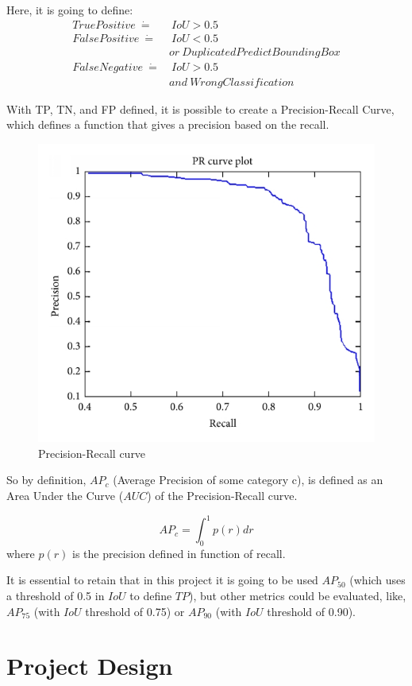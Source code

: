 \documentclass[11pt, a4paper, twocolumn]{article}
\begin{document}
Here, it is going to define:
\begin{align*}
TruePositive\ \dot=&\ IoU > 0.5 \\
FalsePositive\ \dot=&\ IoU < 0.5 \\
         &or\ Duplicated PredictBoundingBox \\
FalseNegative\ \dot=&\ IoU > 0.5\ \\ 
&and \ WrongClassification
\end{align*}

With TP, TN, and FP defined, it is possible to create a Precision-Recall Curve, which defines a function that gives a precision based on the recall.

\begin{figure}[ht]
	
	\centering
	\includegraphics[width=.5\textwidth]{precision-recall.png}
	\caption{\scriptsize Precision-Recall curve \cite{medium:1}}
	
\end{figure}

So by definition, $AP_c$ (Average Precision of some category c), is defined as an Area Under the Curve ($AUC$) of the Precision-Recall curve.

{\centering
\begin{equation*}
AP_c = \int_{0}^{1} p(r) dr
\end{equation*}
where $p(r)$ is the precision defined in function of recall.}

It is essential to retain that in this project it is going to be used $AP_{50}$ (which uses a threshold of 0.5 in $IoU$ to define $TP$), but other metrics could be evaluated, like, $AP_{75}$ (with $IoU$ threshold of 0.75) or $AP_{90}$ (with $IoU$ threshold of 0.90).

\section{Project Design}
\end{document}
